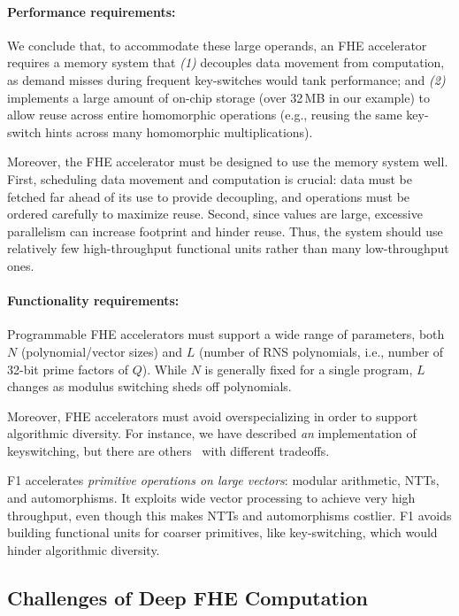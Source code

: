 \paragraph{Performance requirements:}
We conclude that, to accommodate these large operands, an FHE accelerator
requires a memory system that \emph{(1)} decouples data movement from
computation, as demand misses during frequent key-switches would tank
performance; and \emph{(2)} implements a large amount of on-chip storage (over
32\,MB in our example) to allow reuse across entire homomorphic operations
(e.g., reusing the same key-switch hints across many homomorphic
multiplications).

Moreover, the FHE accelerator must be designed to use the memory system well.
First, scheduling data movement and computation is crucial: data must be
fetched far ahead of its use to provide decoupling, and operations must be
ordered carefully to maximize reuse. Second, since values are large, excessive
parallelism can increase footprint and hinder reuse. Thus, the system should
use relatively few high-throughput functional units rather than many
low-throughput ones.

\paragraph{Functionality requirements:}
Programmable FHE accelerators must support a wide range of parameters, both $N$
(polynomial/vector sizes) and $L$ (number of RNS polynomials, i.e., number of
32-bit prime factors of $Q$). While $N$ is generally fixed for a single
program, $L$ changes as modulus switching sheds off polynomials.

Moreover, FHE accelerators must avoid overspecializing in order to support algorithmic diversity.
For instance, we have described \emph{an} implementation of keyswitching, but
there are others~\cite{kim:jmir18:helr,gentry:crypto2012:homomorphic}
with different tradeoffs.

F1 accelerates \emph{primitive operations on large vectors}:
modular arithmetic, NTTs, and automorphisms. It exploits wide vector processing
to achieve very high throughput, even though this makes NTTs and automorphisms
costlier. F1 avoids building functional units for coarser primitives, like
key-switching, which would hinder algorithmic diversity.

\subsection{Challenges of Deep FHE Computation}\label{sec:deepChallenges}

